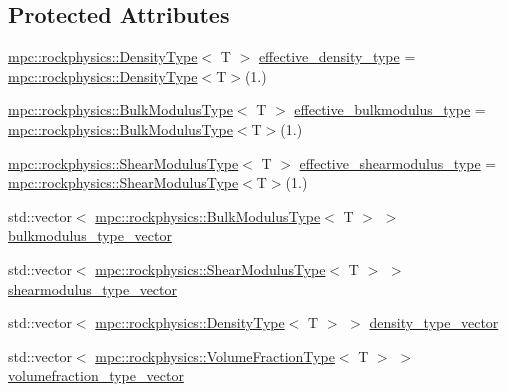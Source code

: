 \subsection*{Protected Attributes}
\begin{DoxyCompactItemize}
\item 
\mbox{\hyperlink{structmpc_1_1rockphysics_1_1_density_type}{mpc\+::rockphysics\+::\+Density\+Type}}$<$ T $>$ \mbox{\hyperlink{classmpc_1_1rockphysics_1_1_scalar_composites_base_a0130d1233808c5fa98d90157274f671c}{effective\+\_\+density\+\_\+type}} = \mbox{\hyperlink{structmpc_1_1rockphysics_1_1_density_type}{mpc\+::rockphysics\+::\+Density\+Type}}$<$T$>$(1.)
\item 
\mbox{\hyperlink{structmpc_1_1rockphysics_1_1_bulk_modulus_type}{mpc\+::rockphysics\+::\+Bulk\+Modulus\+Type}}$<$ T $>$ \mbox{\hyperlink{classmpc_1_1rockphysics_1_1_scalar_composites_base_a6ca760221b4aedaa09698317c7fddfb3}{effective\+\_\+bulkmodulus\+\_\+type}} = \mbox{\hyperlink{structmpc_1_1rockphysics_1_1_bulk_modulus_type}{mpc\+::rockphysics\+::\+Bulk\+Modulus\+Type}}$<$T$>$(1.)
\item 
\mbox{\hyperlink{structmpc_1_1rockphysics_1_1_shear_modulus_type}{mpc\+::rockphysics\+::\+Shear\+Modulus\+Type}}$<$ T $>$ \mbox{\hyperlink{classmpc_1_1rockphysics_1_1_scalar_composites_base_a3d48702bd7ed14bd922f3e3991111d1b}{effective\+\_\+shearmodulus\+\_\+type}} = \mbox{\hyperlink{structmpc_1_1rockphysics_1_1_shear_modulus_type}{mpc\+::rockphysics\+::\+Shear\+Modulus\+Type}}$<$T$>$(1.)
\item 
std\+::vector$<$ \mbox{\hyperlink{structmpc_1_1rockphysics_1_1_bulk_modulus_type}{mpc\+::rockphysics\+::\+Bulk\+Modulus\+Type}}$<$ T $>$ $>$ \mbox{\hyperlink{classmpc_1_1rockphysics_1_1_scalar_composites_base_ade366a52f2f7d29a24d3ff200aa968f4}{bulkmodulus\+\_\+type\+\_\+vector}}
\item 
std\+::vector$<$ \mbox{\hyperlink{structmpc_1_1rockphysics_1_1_shear_modulus_type}{mpc\+::rockphysics\+::\+Shear\+Modulus\+Type}}$<$ T $>$ $>$ \mbox{\hyperlink{classmpc_1_1rockphysics_1_1_scalar_composites_base_af6363e3a8cee280c18dbea704d70cf6a}{shearmodulus\+\_\+type\+\_\+vector}}
\item 
std\+::vector$<$ \mbox{\hyperlink{structmpc_1_1rockphysics_1_1_density_type}{mpc\+::rockphysics\+::\+Density\+Type}}$<$ T $>$ $>$ \mbox{\hyperlink{classmpc_1_1rockphysics_1_1_scalar_composites_base_a42b8687558e57e8c9e8548a7041107a9}{density\+\_\+type\+\_\+vector}}
\item 
std\+::vector$<$ \mbox{\hyperlink{structmpc_1_1rockphysics_1_1_volume_fraction_type}{mpc\+::rockphysics\+::\+Volume\+Fraction\+Type}}$<$ T $>$ $>$ \mbox{\hyperlink{classmpc_1_1rockphysics_1_1_scalar_composites_base_a7b14158ca347b93da4c97cbcdfaa9e31}{volumefraction\+\_\+type\+\_\+vector}}
\end{DoxyCompactItemize}


